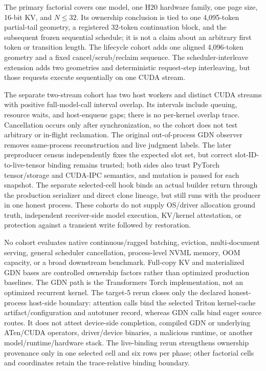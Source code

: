 \documentclass{article}
\begin{document}
The primary factorial covers one model, one H20 hardware family, one page
size, 16-bit KV, and $N\leq32$.  Its ownership conclusion is tied to one
4,095-token partial-tail geometry, a registered 32-token continuation block,
and the subsequent frozen sequential schedule; it is not a claim about an
arbitrary first token or transition length.  The lifecycle cohort adds one
aligned 4,096-token geometry and a fixed cancel/scrub/reclaim sequence.  The
scheduler-interleave extension adds two geometries and deterministic
request-step interleaving, but those requests execute sequentially on one CUDA
stream.

The separate two-stream cohort has two host workers and distinct CUDA streams
with positive full-model-call interval overlap.  Its intervals include
queuing, resource waits, and host-enqueue gaps; there is no per-kernel overlap
trace.  Cancellation occurs only after synchronization, so the cohort does not
test arbitrary or in-flight reclamation.  The original out-of-process GDN
observer removes same-process reconstruction and live judgment labels.  The
later preproducer census independently fixes the expected slot set, but correct
slot-ID-to-live-tensor binding remains trusted; both sides also trust PyTorch
tensor/storage and CUDA-IPC semantics, and mutation is paused for each snapshot.
The separate selected-cell hook binds an actual builder return through the
production serializer and direct clone lineage, but still runs with the
producer in one honest process.  These cohorts do not supply OS/driver
allocation ground truth, independent receiver-side model execution,
KV/kernel attestation, or protection against a transient write followed by
restoration.

No cohort evaluates native continuous/ragged batching, eviction,
multi-document serving, general scheduler cancellation, process-level NVML
memory, OOM capacity, or a broad downstream benchmark.  Full-copy KV and
materialized GDN bases are controlled ownership factors rather than optimized
production baselines.  The GDN path is the Transformers Torch implementation,
not an optimized recurrent kernel.  The target-5 rerun closes only the declared
honest-process host-side boundary: attention calls bind the selected Triton
kernel-cache artifact/configuration and autotuner record, whereas GDN calls bind
eager source routes.  It does not attest device-side completion, compiled GDN
or underlying ATen/CUDA operators, driver/device binaries, a malicious runtime,
or another model/runtime/hardware stack.  The live-binding rerun strengthens
ownership provenance only in one selected cell and six rows per phase; other
factorial cells and coordinates retain the trace-relative binding boundary.
\end{document}
